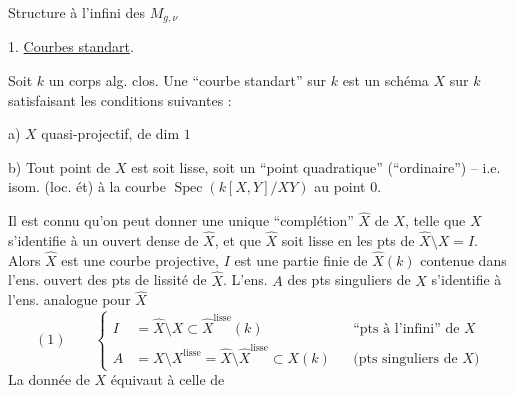 Structure à l'infini des $M_{g,\nu}$

1. \uline{Courbes standart}.

Soit $k$ un corps alg. clos. Une ``courbe standart'' sur $k$ est un schéma $X$ sur $k$ satisfaisant les conditions suivantes :

a) $X$ quasi-projectif,  de dim $1$

b) Tout point de $X$ est soit lisse, soit un ``point quadratique'' (``ordinaire'') -- i.e. isom. (loc. ét) à la courbe $\operatorname{Spec}(k[X,Y]/XY)$ au point $0$.

Il est connu qu'on peut donner une unique ``complétion'' $\widehat X$ de $X$, telle que  $X$ s'identifie à un ouvert dense de $\widehat X$, et que $\widehat X$ soit lisse en les pts de $\widehat X\setminus X=I$. Alors $\widehat X$ est une courbe projective, $I$ est  une partie finie de $\widehat X(k)$ contenue dans l'ens. ouvert des pts de lissité de $\widehat X$. L'ens. $A$ des pts singuliers de $X$ s'identifie à l'ens. analogue pour $\widehat X$
\[
(1)\qquad
\left\{\begin{aligned}
I&=\widehat X\setminus X\subset\widehat X^{\mathrm{lisse}}(k)
&&\text{``pts à l'infini'' de }X\\
A&=X\setminus X^{\mathrm{lisse}}=\widehat X\setminus\widehat X^{\mathrm{lisse}}\subset X(k)
&&\text{(pts singuliers de }X\text{)}
\end{aligned}\right.
\]
La donnée de $X$ équivaut à celle de

